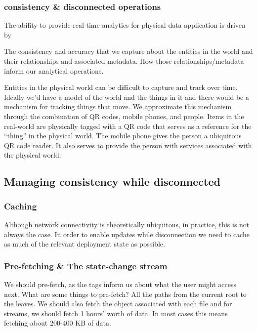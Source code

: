 \subsubsection{consistency \& disconnected operations}

The ability to provide real-time analytics for physical data application is driven by 

The consistency and accuracy that we capture about the entities in the world and their relationships and associated metadata.
How those relationships/metadata inform our analytical operations.

Entities in the physical world can be difficult to capture and track over time.  Ideally we’d have a model of the world and the things in it and there would be a mechanism for tracking things that move.  We approximate this mechanism through the combination of QR codes, mobile phones, and people.  Items in the real-world are physically tagged with a QR code that serves as a reference for the “thing” in the physical world.  The mobile phone gives the person a ubiquitous QR code reader.  It also serves to provide the person with services associated with the physical world.

\subsection{Managing consistency while disconnected}

\subsubsection{Caching}
Although network connectivity is theoretically ubiquitous, in practice, this is not always the case.  In order to enable updates while disconnection we need to cache as much of the relevant deployment state as possible.

\subsubsection{Pre-fetching \& The state-change stream}
We should pre-fetch, as the tags inform us about what the user might access next.  What are some things to pre-fetch?  All the paths from the current root to the leaves.  We should also fetch the object associated with each file and for streams, we should fetch 1 hours’ worth of data.  In most cases this means fetching about 200-400 KB of data.

